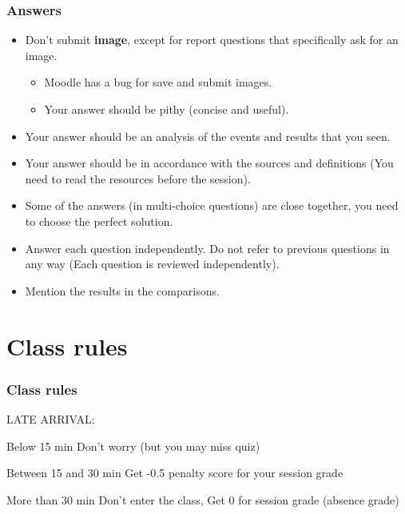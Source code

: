 \documentclass[aspectratio=169,15pt]{beamer}
\begin{document}
\begin{frame}
    \frametitle{Answers}

    \begin{itemize}
        \item Don’t submit \textbf{image}, except for report questions that specifically ask for an image.
        \begin{itemize}
            \item Moodle has a bug for save and submit images.
            \item Your answer should be pithy (concise and useful).
        \end{itemize}
        \item Your answer should be an analysis of the events and results that you seen.
        \item Your answer should be in accordance with the sources and definitions (You need to read the resources before the session).
        \item Some of the answers (in multi-choice questions) are close together, you need to choose the perfect solution.
        \item Answer each question independently. Do not refer to previous questions in any way (Each question is reviewed independently).
        \item Mention the results in the comparisons.
    \end{itemize}

\end{frame}

\section{Class rules}
\begin{frame}
    \frametitle{Class rules}

    LATE ARRIVAL:
    {
        \begin{block}{Below 15 min} Don’t worry (but you may miss quiz) \end{block}
    }
    {
        \begin{block}{Between 15 and 30 min} Get \alert{-0.5} penalty score for your session grade \end{block}
    }
    \begin{alertblock}{More than 30 min} Don’t enter the class, Get \alert{0} for session grade (absence grade) \end{alertblock}

\end{frame}
\end{document}
